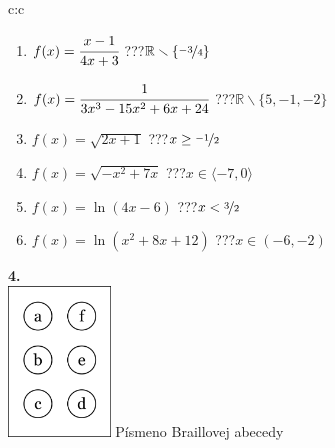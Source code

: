 \documentclass[10pt]{report}
\begin{document}
\begin{tabular}{c:c}
\begin{minipage}[c][104.5mm][t]{0.5\linewidth}
\begin{center}
\begin{minipage}{0.79\linewidth}
\begin{center}
\begin{varwidth}{\linewidth}
\begin{enumerate}
\item $f(x)=\cfrac{x-1}{4x+3}$\quad \dotfill\; ???\;\dotfill \quad $\mathbb{R}\smallsetminus\{\nicefrac{-3}{4}\}$
\item $f(x)=\cfrac{1}{3x^3-15x^2+6x+24}$\quad \dotfill\; ???\;\dotfill \quad $\mathbb{R}\smallsetminus\{5,-1,-2\}$
\item $f(x)=\sqrt{2x+1}$\quad \dotfill\; ???\;\dotfill \quad $x\geq\nicefrac{-1}{2}$
\item $f(x)=\sqrt{-x^2+7x}$\quad \dotfill\; ???\;\dotfill \quad $x\in\langle-7 , 0\rangle$
\item $f(x)=\ln{(4x-6)}$\quad \dotfill\; ???\;\dotfill \quad $x<\nicefrac{3}{2}$
\item $f(x)=\ln{(x^2+8x+12)}$\quad \dotfill\; ???\;\dotfill \quad $x\in(-6 , -2)$
\end{enumerate}
\end{varwidth}
\end{center}
\end{minipage}
\begin{minipage}{0.20\linewidth}
\begin{center}
{\Huge\bfseries 4.} \\[2mm]
\includegraphics[height=40mm]{../images/braille.png}
{\small Písmeno Braillovej abecedy}
\end{center}
\end{minipage}
\end{center}
\end{minipage}
%
\end{tabular}
\newpage
\thispagestyle{empty}
\end{document}
